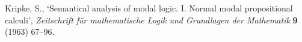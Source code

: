 \documentclass[draft]{article}
\def\K{\mathbf{K}}
\begin{document}
\begin{thebibliography}{}
%
%
%
%
%
%
%
%
%
%
%
%
%
%
%
%
%
%
%
%
{\sc Kripke,} S.,
`Semantical analysis of modal logic. I. Normal modal propositional calculi',
\emph{Zeitschrift f\"ur mathematische Logik und Grundlagen der Mathematik}\/ {\bf 9} (1963) 67--96.
%
%
%
%
%
%
%
%

\end{thebibliography}
\end{document}
